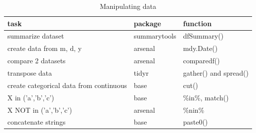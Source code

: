 \documentclass[
]{book}
\begin{document}
\begin{table}

\caption{\label{tab:unnamed-chunk-3}Manipulating data}
\centering
\begin{tabular}[t]{l|l|l}
\hline
task & package & function\\
\hline
summarize dataset & summarytools & dfSummary()\\
\hline
create data from m, d, y & arsenal & mdy.Date()\\
\hline
compare 2 datasets & arsenal & comparedf()\\
\hline
transpose data & tidyr & gather() and spread()\\
\hline
create categorical data from continuous & base & cut()\\
\hline
X in ('a','b','c') & base & \%in\%, match()\\
\hline
X NOT in ('a','b','c') & arsenal & \%nin\%\\
\hline
concatenate strings & base & paste0()\\
\hline
\end{tabular}
\end{table}
\end{document}
